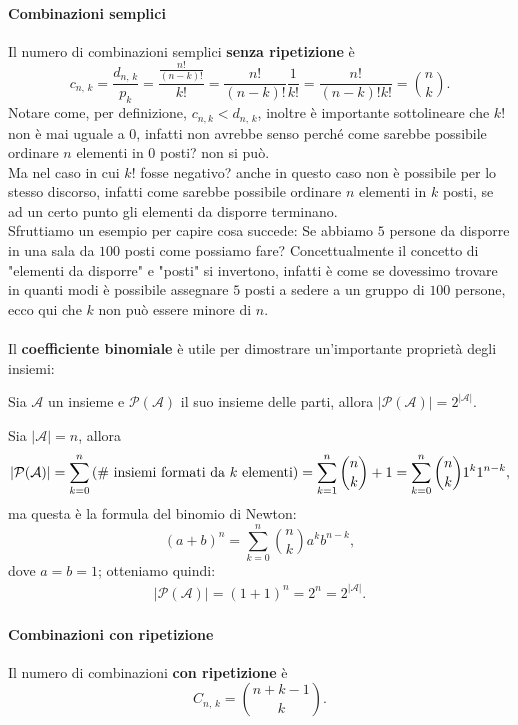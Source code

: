 \paragraph{Combinazioni semplici}
Il numero di combinazioni semplici \textbf{senza ripetizione} è \[
\boxed{
c_{n, \, k} = \frac{d_{n, \, k}}{p_k} = \frac{\frac{n!}{(n - k)!}}{k!} = \frac{n!}{(n-k)!} \frac{1}{k!} = \frac{n!}{(n-k)!k!} = \binom{n}{k}
}.
\]
Notare come, per definizione, $c_{n, k} < d_{n, \, k}$, inoltre è importante sottolineare che $k!$ non è mai uguale a $0$, infatti non avrebbe senso perché come sarebbe possibile ordinare $n$ elementi in $0$ posti? non si può.
\\
Ma nel caso in cui $k!$ fosse negativo? anche in questo caso non è possibile per lo stesso discorso, infatti come sarebbe possibile ordinare $n$ elementi in $k$ posti, se ad un certo punto gli elementi da disporre terminano.
\\
Sfruttiamo un esempio per capire cosa succede:
Se abbiamo $5$ persone da disporre in una sala da $100$ posti come possiamo fare?
Concettualmente il concetto di "elementi da disporre" e "posti" si invertono, infatti è come se dovessimo trovare in quanti modi è possibile assegnare $5$ posti a sedere a un gruppo di $100$ persone, ecco qui che $k$ non può essere minore di $n$.
\\
\\
Il \textbf{coefficiente binomiale} è utile per dimostrare un'importante proprietà degli insiemi:
\begin{teorema}
Sia $\mathcal A$ un insieme e $\mathcal{P}(\mathcal A)$ il suo insieme delle parti, allora $|\mathcal{P}(\mathcal A)| = 2^{|\mathcal A|}$.
\end{teorema}
\begin{dimostrazione}
Sia $|\mathcal A| = n$, allora \[|\mathcal{P}(\mathcal A)| = \sum\limits_{k=0}^{n}{\textnormal{(\# insiemi formati da $k$ elementi)}} = \sum\limits_{k=1}^n{\binom{n}{k}} + 1 = \sum\limits_{k=0}^n{\binom{n}{k}} 1^k 1^{n-k},
\]
ma questa è la formula del binomio di Newton: \[
(a+b)^n = \sum\limits_{k=0}^n{\binom{n}{k}} a^k b^{n-k},\] dove $a=b=1$;
otteniamo quindi: \begin{align*}
|\mathcal{P}(\mathcal A)| = (1+1)^n = 2^n = 2^{|\mathcal A|}. \tag*{$\blacksquare$} \end{align*}
\end{dimostrazione}

\paragraph{Combinazioni con ripetizione}
Il numero di combinazioni \textbf{con ripetizione} è \[
\boxed{
C_{n, \, k} = \binom{n+k-1}{k}
}.
\]

